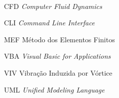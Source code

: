 

\imprimirfolhaderosto\

% 

% 

% 

% 

%



\listoffigures*
\cleardoublepage

\listoftables*
\cleardoublepage

\begin{siglas}
  \item[CFD] \textit{Computer Fluid Dynamics}
  \item[CLI] \textit{Command Line Interface}
  \item[MEF] Método dos Elementos Finitos
  \item[VBA] \textit{Visual Basic for Applications}
  \item[VIV] Vibração Induzida por Vórtice
  \item[UML] \textit{Unified Modeling Language}
\end{siglas}


\tableofcontents*
\cleardoublepage